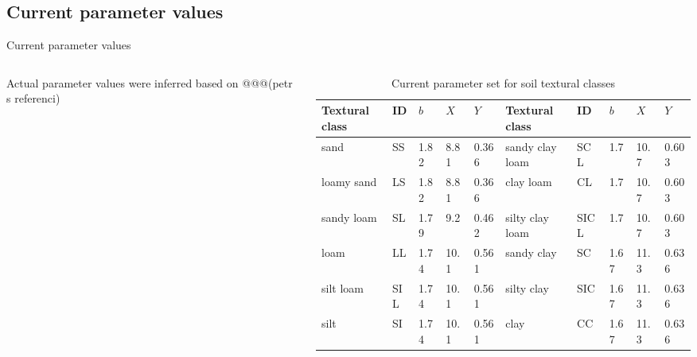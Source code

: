 \subsection{Current  parameter values}
\begin{block}{Current  parameter values}\vspace{-1cm}
\begin{columns}
    \begin{column}{0.25\textwidth}
        \justifying
        Actual parameter values were inferred based on @@@(petr s referenci)
    \end{column}
    \begin{column}{0.75\textwidth}
        \begin{table}[]
            \small
            \caption{Current parameter set for soil textural classes}
            \begin{tabular}{lllll|lllll}
            \hline
            \hline
            Textural class & ID  & $b$    & $X$    & $Y$     & Textural class  & ID   & $b$    & $X$    & $Y$  \\
            \hline
            sand           & SS  & 1.82 & 8.81 & 0.366 & sandy clay loam & SCL  & 1.7  & 10.7 & 0.603 \\
            loamy sand     & LS  & 1.82 & 8.81 & 0.366 & clay loam       & CL   & 1.7  & 10.7 & 0.603 \\
            sandy loam     & SL  & 1.79 & 9.2  & 0.462 & silty clay loam & SICL & 1.7  & 10.7 & 0.603 \\
            loam           & LL  & 1.74 & 10.1 & 0.561 & sandy clay      & SC   & 1.67 & 11.3 & 0.636 \\
            silt loam      & SIL & 1.74 & 10.1 & 0.561 & silty clay      & SIC  & 1.67 & 11.3 & 0.636 \\
            silt           & SI  & 1.74 & 10.1 & 0.561 & clay            & CC   & 1.67 & 11.3 & 0.636 \\
            \hline
            \hline
            \end{tabular}
        \end{table}
    \end{column}
\end{columns}
    
\end{block}

